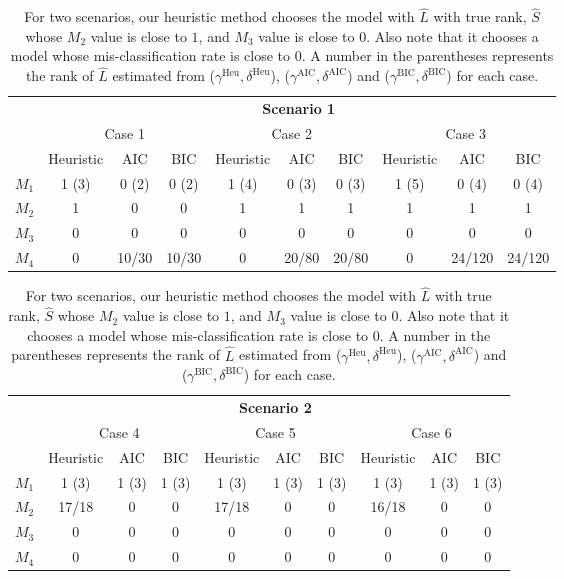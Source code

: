 \documentclass[AMS,STIX1COL]{WileyNJD-v2}
\begin{document}
{\begin{enumerate}
    \begin{table}[htbp]
    \centering
    \begin{tabular}{c|ccc|ccc|ccc}
                & \multicolumn{9}{c}{\textbf{Scenario 1}}                                              \\
                \cline{2-10}
                & \multicolumn{3}{c|}{Case 1} & \multicolumn{3}{c|}{Case 2} & \multicolumn{3}{c}{Case 3} \\
                \cline{2-10}
                & Heuristic   & AIC   & BIC  & Heuristic   & AIC   & BIC  & Heuristic   & AIC   & BIC  \\
                \hline
    $M_{1}$   &    1 (3)  &    0 (2)   &  0 (2)  &    1 (4)    &  0 (3)   &  0 (3)  &    1 (5)  &   0 (4)    & 0 (4) \\
    $M_{2}$   &    1     &    0 &      0 &         1    &     1  &    1  &         1    &    1   &   1   \\
    $M_{3}$   &    0     &    0 &      0 &         0    &     0  &    0  &         0    &    0   &   0   \\
    $M_{4}$   &  0  &    10/30    &  10/30     &   0   &   20/80    &   20/80   &  0      &  24/120     &   24/120    \\
                \hline
    \end{tabular}

    \begin{tabular}{c|ccc|ccc|ccc}
                & \multicolumn{9}{c}{\textbf{Scenario 2}}                                              \\
                \cline{2-10}
                & \multicolumn{3}{c|}{Case 4} & \multicolumn{3}{c|}{Case 5} & \multicolumn{3}{c}{Case 6} \\
                \cline{2-10}
                & Heuristic   & AIC   & BIC  &    Heuristic   & AIC   & BIC  & Heuristic   & AIC   & BIC  \\
                \hline
    $M_{1}$   &   1 (3)     &     1 (3)  &  1 (3)    &      1 (3)   &   1 (3)    &  1 (3)    &   1 (3)     &  1 (3)   & 1 (3)   \\
    $M_{2}$   &   17/18   &   0    &    0  &   17/18     &   0    &  0    &  16/18    &   0    &  0    \\
    $M_{3}$   &   0 &     0  &   0   &        0     &    0   &  0    &        0     &   0    & 0 \\
    $M_{4}$   &  0  &   0    &  0    &   0          &   0    &   0   &  0      &  0     &   0   \\
                \hline
    \end{tabular}
    \caption{ For two scenarios, our heuristic method chooses the model with $\widehat{L}$ with true rank, $\widehat{S}$ whose $M_2$ value is close to $1$, and $M_3$ value is close to $0$.
    Also note that it chooses a model whose mis-classification rate is close to $0$.
    A number in the parentheses represents the rank of $\widehat{L}$ estimated from ($\gamma^{\text{Heu}},\delta^{\text{Heu}}$), ($\gamma^{\text{AIC}},\delta^{\text{AIC}}$) and ($\gamma^{\text{BIC}},\delta^{\text{BIC}}$) for each case.}
    \label{tab:table1}
    \end{table}


\end{enumerate}}
\end{document}
